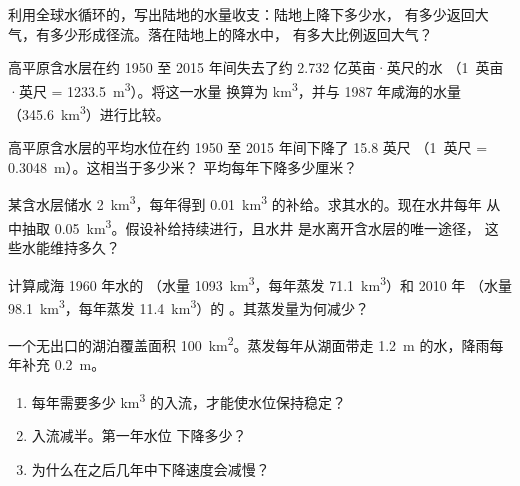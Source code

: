 \begin{exercise}[$\star\star$]\label{exo:g10:freshwater-resources:8}
利用全球水循环的，写出陆地的水量收支：陆地上降下多少水，
有多少返回大气，有多少形成径流。落在陆地上的降水中，
有多大比例返回大气？
\end{exercise}

\begin{exercise}[$\star\star$]\label{exo:g10:freshwater-resources:9}
高平原含水层在约 1950 至 2015 年间失去了约 2.732 亿英亩·英尺的水
（\num{1}~英亩·英尺 = \qty{1233.5}{m^3}）。将这一水量
换算为 \unit{km^3}，并与 1987 年咸海的水量
（\qty{345.6}{km^3}）进行比较。
\end{exercise}

\begin{exercise}[$\star\star$]\label{exo:g10:freshwater-resources:10}
高平原含水层的平均水位在约 1950 至 2015 年间下降了 \num{15.8} 英尺
（\num{1}~英尺 = \qty{0.3048}{m}）。这相当于多少米？
平均每年下降多少厘米？
\end{exercise}

\begin{exercise}[$\star\star$]\label{exo:g10:freshwater-resources:11}
某含水层储水 \qty{2}{km^3}，每年得到
\qty{0.01}{km^3} 的补给。求其水的。现在水井每年
从中抽取 \qty{0.05}{km^3}。假设补给持续进行，且水井
是水离开含水层的唯一途径，
这些水能维持多久？
\end{exercise}

\begin{exercise}[$\star\star\star$]\label{exo:g10:freshwater-resources:12}
计算咸海 1960 年水的
（水量 \qty{1093}{km^3}，每年蒸发 \qty{71.1}{km^3}）和 2010 年
（水量 \qty{98.1}{km^3}，每年蒸发 \qty{11.4}{km^3}）的
。其蒸发量为何减少？
\end{exercise}

\begin{exercise}[$\star\star\star$]\label{exo:g10:freshwater-resources:13}
一个无出口的湖泊覆盖面积 \qty{100}{km^2}。蒸发每年从湖面带走
\qty{1.2}{m} 的水，降雨每年补充 \qty{0.2}{m}。
\begin{enumerate}
  \item 每年需要多少 \unit{km^3} 的入流，才能使水位保持稳定？
  \item 入流减半。第一年水位
        下降多少？
  \item 为什么在之后几年中下降速度会减慢？
\end{enumerate}
\end{exercise}

